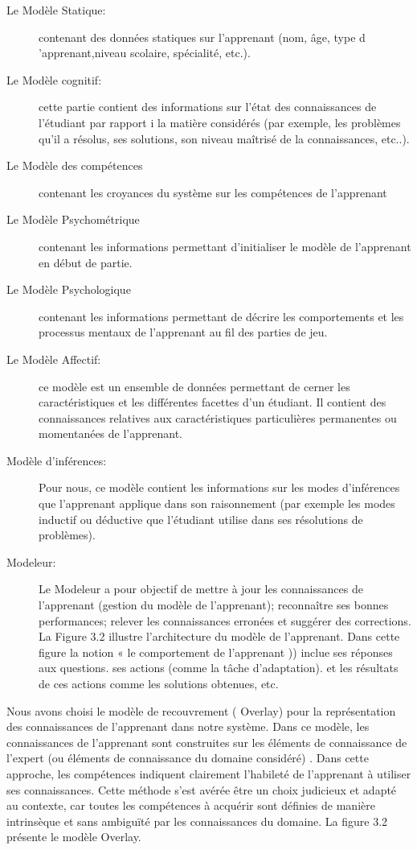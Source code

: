 \begin{description}
    \item[Le Modèle Statique:] contenant des données statiques sur l'apprenant (nom, âge, type d 'apprenant,niveau scolaire, spécialité,  etc.).
    \item[Le Modèle cognitif:]  cette partie contient des informations sur l'état des connaissances de l'étudiant par rapport i la matière considérés (par exemple, les problèmes qu'il a résolus, ses solutions, son niveau maîtrisé de la connaissances, etc..).
    \item[Le Modèle des compétences] contenant les croyances du système sur les compétences de l'apprenant
    \item[Le Modèle Psychométrique] contenant les informations permettant d'initialiser le modèle de l'apprenant en début de partie.
    \item[Le Modèle Psychologique] contenant les informations permettant de décrire les comportements et les processus mentaux de l'apprenant au fil des parties de jeu. 
    \item[Le Modèle Affectif:] ce modèle est un ensemble de données permettant de cerner les caractéristiques et les différentes facettes d'un étudiant. Il contient des connaissances relatives aux caractéristiques particulières permanentes ou momentanées de l'apprenant.
    \item[Modèle d'inférences:] Pour nous, ce modèle contient les informations sur les modes d'inférences que l'apprenant applique dans son raisonnement (par exemple les modes inductif ou déductive que l'étudiant utilise dans ses résolutions de problèmes).
    \item[Modeleur:] Le Modeleur a pour objectif de mettre à jour les connaissances de l'apprenant (gestion du modèle de l'apprenant); reconnaître ses bonnes performances; relever les connaissances erronées et suggérer des corrections. La Figure 3.2 illustre l'architecture du modèle de l'apprenant. Dans cette figure la notion « le comportement de l'apprenant )) inclue ses réponses aux questions. ses actions (comme la tâche d'adaptation). et les résultats de ces actions comme les solutions obtenues, etc.
\end{description}

Nous avons choisi le modèle de recouvrement ( Overlay) pour la représentation des connaissances de l'apprenant dans notre système. Dans ce modèle, les connaissances de l'apprenant sont construites sur les éléments de connaissance de l'expert (ou éléments de connaissance du domaine considéré) . Dans cette approche, les compétences indiquent clairement l'habileté de l'apprenant à utiliser ses connaissances. Cette méthode s'est avérée être un choix judicieux et adapté au contexte, car toutes les compétences à acquérir sont définies de manière intrinsèque et sans ambiguïté par les connaissances du domaine. La figure 3.2 présente le modèle Overlay. 

